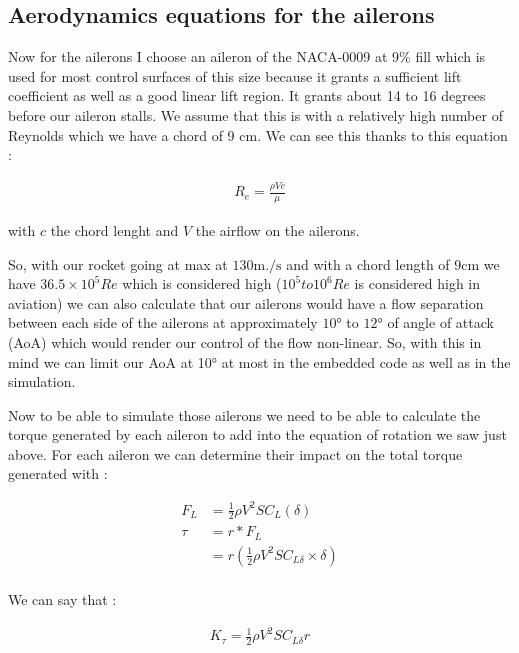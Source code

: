 \subsection{Aerodynamics equations for the ailerons}

Now for the ailerons I choose an aileron of the NACA-0009 at 9\% fill which is
used for most control surfaces of this size because it grants a sufficient lift
coefficient as well as a good linear lift region. It grants about 14 to 16
degrees before our aileron stalls. We assume that this is with a relatively
high number of Reynolds which we have a chord of 9 cm. We can see this thanks
to this equation :

\begin{gather*}
    R_e = \frac{\rho V c}{\mu}
\end{gather*}

with $c$ the chord lenght and $V$ the airflow on the ailerons.

So, with our rocket going at max at $130 \si{\meter.\per\second}$ and with a
chord length of $9 \si{\centi\meter}$ we have $36.5 \times 10^5 Re$ which is
considered high ($10^5 to 10^6 Re$ is considered high in aviation) we can also
calculate that our ailerons would have a flow separation between each side of
the ailerons at approximately $10 \si{\degree}$ to $12 \si{\degree}$ of angle
of attack (AoA) which would render our control of the flow non-linear. So, with
this in mind we can limit our AoA at 10° at most in the embedded code as well
as in the simulation.

Now to be able to simulate those ailerons we need to be able to calculate the
torque generated by each aileron to add into the equation of rotation we saw
just above. For each aileron we can determine their impact on the total torque
generated with :

\begin{align*}
    F_L  & = \frac{1}{2} \rho V^2 S C_L (\delta)                    \\
    \tau & = r * F_L                                                \\
         & = r ( \frac{1}{2} \rho V^2 S C_{L \delta} \times \delta) \\
\end{align*}

We can say that :

\begin{gather*}
    K_\tau = \frac{1}{2} \rho V^2 S C_{L \delta} r
\end{gather*}

